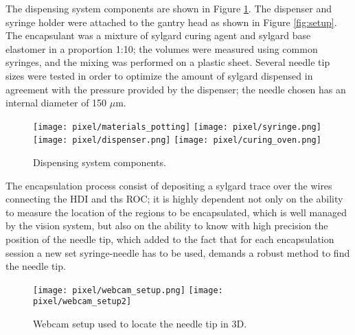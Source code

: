 The dispensing system components are shown in Figure \ref{fig:potting_comp}. The dispenser and syringe holder were attached to the gantry head as shown in Figure \ref{fig:setup}. The encapsulant was a mixture of sylgard curing agent and sylgard base elastomer in a proportion 1:10; the volumes were measured using common syringes, and the mixing was performed on a plastic sheet. Several needle tip sizes were tested in order to optimize the amount of sylgard dispensed in agreement with the pressure provided by the dispenser; the needle chosen has an internal diameter of 150 $\mu$m.

\begin{figure}[h]
  \begin{center}
    \texttt{[image: pixel/materials\_potting]}
    \texttt{[image: pixel/syringe.png]}\\
    \texttt{[image: pixel/dispenser.png]}
    \texttt{[image: pixel/curing\_oven.png]}
    \caption[Dispensing system components.]{Dispensing system components.}\label{fig:potting_comp}
  \end{center}
\end{figure}

The encapsulation process consist of depositing a sylgard trace over the wires connecting the HDI and ths ROC; it is highly dependent not only on the ability to measure the location of the regions to be encapsulated, which is well managed by the vision system, but also on the ability to know with high precision the position of the needle tip, which added to the fact that for each encapsulation session a new set syringe-needle has to be used, demands a robust method to find the needle tip.

\begin{figure}[h]
  \begin{center}
    \texttt{[image: pixel/webcam\_setup.png]}
    \texttt{[image: pixel/webcam\_setup2]}
    \caption[Webcam setup.]{Webcam setup used to locate the needle tip in 3D.}\label{fig:webcam_setup}
  \end{center}
\end{figure}

